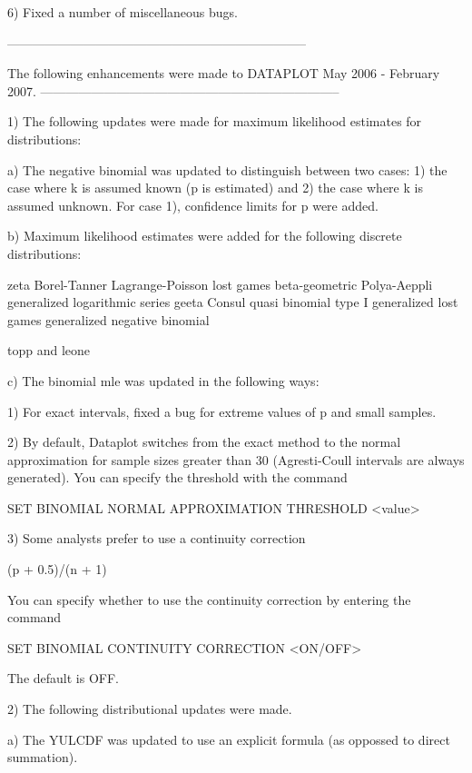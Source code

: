 { 6) Fixed a number of miscellaneous bugs.

-----------------------------------------------------------------------

The following enhancements were made to DATAPLOT
May 2006 - February  2007.
-----------------------------------------------------------------------

 1) The following updates were made for maximum likelihood estimates
    for distributions:

    a) The negative binomial was updated to distinguish between
       two cases: 1) the case where k is assumed known (p is
       estimated) and 2) the case where k is assumed unknown.
       For case 1), confidence limits for p were added.

    b) Maximum likelihood estimates were added for the
       following discrete distributions:

          zeta
          Borel-Tanner
          Lagrange-Poisson
          lost games
          beta-geometric
          Polya-Aeppli
          generalized logarithmic series
          geeta
          Consul
          quasi binomial type I
          generalized lost games
          generalized negative binomial

          topp and leone

    c) The binomial mle was updated in the following ways:

       1) For exact intervals, fixed a bug for extreme values
          of p and small samples.

       2) By default, Dataplot switches from the exact method
          to the normal approximation for sample sizes greater
          than 30 (Agresti-Coull intervals are always generated).
          You can specify the threshold with the command

              SET BINOMIAL NORMAL APPROXIMATION THRESHOLD <value>

       3) Some analysts prefer to use a continuity correction

             (p + 0.5)/(n + 1)

          You can specify whether to use the continuity
          correction by entering the command

              SET BINOMIAL CONTINUITY CORRECTION <ON/OFF>

          The default is OFF.

 2) The following distributional updates were made.

    a) The YULCDF was updated to use an explicit formula (as
       oppossed to direct summation).

}
